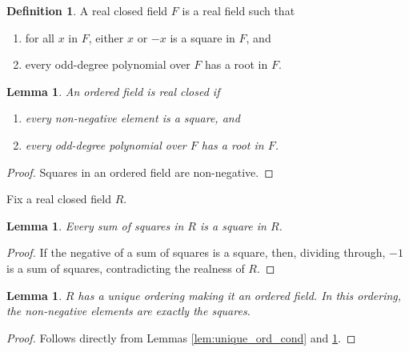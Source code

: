 \documentclass[a4paper]{report}
\newtheorem{lemma}[theorem]{Lemma}
\theoremstyle{definition}
\newtheorem{definition}[theorem]{Definition}
\begin{document}
\begin{definition}
  \label{def:RCF}
  \mathlibok
  A real closed field $F$ is a real field such that
  \begin{enumerate}
    \item for all $x$ in $F$, either $x$ or $-x$ is a square in $F$, and
    \item every odd-degree polynomial over $F$ has a root in $F$.
  \end{enumerate}
\end{definition}

\begin{lemma}
  \label{lem:RCF_ord_ax}
  \mathlibok
  An ordered field is real closed if
  \begin{enumerate}
    \item every non-negative element is a square, and
    \item every odd-degree polynomial over $F$ has a root in $F$.
  \end{enumerate}
\end{lemma}
\begin{proof}
  \mathlibok
  Squares in an ordered field are non-negative.
\end{proof}

Fix a real closed field $R$.

\begin{lemma}
  \label{lem:RCF_sumsq_is_sq}
  Every sum of squares in $R$ is a square in $R$.
\end{lemma}
\begin{proof}
  If the negative of a sum of squares is a square, then, dividing through, $-1$ is a sum of squares, contradicting the realness of $R$.
\end{proof}

\begin{lemma}
  \label{lem:RCF_ord_unique}
  \mathlibok
  $R$ has a unique ordering making it an ordered field. In this ordering, the non-negative elements are exactly the squares.
\end{lemma}
\begin{proof}
  \mathlibok
  Follows directly from Lemmas \ref{lem:unique_ord_cond} and \ref{lem:RCF_sumsq_is_sq}.
\end{proof}
\end{document}
